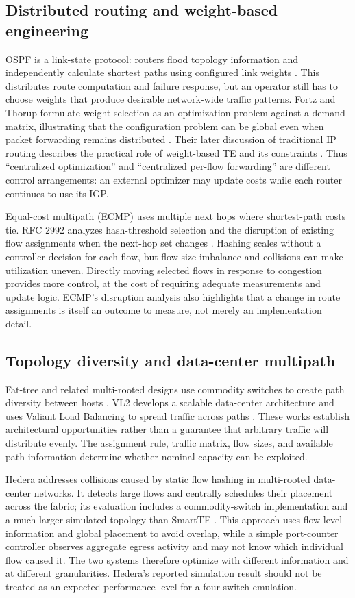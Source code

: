 \subsection{Distributed routing and weight-based engineering}
OSPF is a link-state protocol: routers flood topology information and independently calculate shortest paths using configured link weights \cite{rfc2328}. This distributes route computation and failure response, but an operator still has to choose weights that produce desirable network-wide traffic patterns. Fortz and Thorup formulate weight selection as an optimization problem against a demand matrix, illustrating that the configuration problem can be global even when packet forwarding remains distributed \cite{fortz2000}. Their later discussion of traditional IP routing describes the practical role of weight-based TE and its constraints \cite{fortz2002}. Thus ``centralized optimization'' and ``centralized per-flow forwarding'' are different control arrangements: an external optimizer may update costs while each router continues to use its IGP.

Equal-cost multipath (ECMP) uses multiple next hops where shortest-path costs tie. RFC 2992 analyzes hash-threshold selection and the disruption of existing flow assignments when the next-hop set changes \cite{rfc2992}. Hashing scales without a controller decision for each flow, but flow-size imbalance and collisions can make utilization uneven. Directly moving selected flows in response to congestion provides more control, at the cost of requiring adequate measurements and update logic. ECMP's disruption analysis also highlights that a change in route assignments is itself an outcome to measure, not merely an implementation detail.

\subsection{Topology diversity and data-center multipath}
Fat-tree and related multi-rooted designs use commodity switches to create path diversity between hosts \cite{alfares2008}. VL2 develops a scalable data-center architecture and uses Valiant Load Balancing to spread traffic across paths \cite{greenberg2009}. These works establish architectural opportunities rather than a guarantee that arbitrary traffic will distribute evenly. The assignment rule, traffic matrix, flow sizes, and available path information determine whether nominal capacity can be exploited.

Hedera addresses collisions caused by static flow hashing in multi-rooted data-center networks. It detects large flows and centrally schedules their placement across the fabric; its evaluation includes a commodity-switch implementation and a much larger simulated topology than SmartTE \cite{hedera}. This approach uses flow-level information and global placement to avoid overlap, while a simple port-counter controller observes aggregate egress activity and may not know which individual flow caused it. The two systems therefore optimize with different information and at different granularities. Hedera's reported simulation result should not be treated as an expected performance level for a four-switch emulation.

